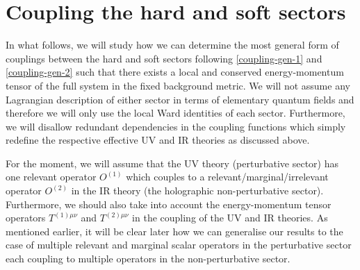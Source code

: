 \documentclass[prd,reprint,a4paper,showpacs,superscriptaddress,11pt,onecolumn,nofootinbib]{revtex4-1}
\renewcommand{\(}{\left(}
\renewcommand{\)}{\right)}
\newcommand{\6}{\partial}
\begin{document}
\section{Coupling the hard and soft sectors}\label{sec:couplingCFTs}
In what follows, we will study how we can determine the most general form of couplings between the hard and soft sectors following \eqref{coupling-gen-1} and \eqref{coupling-gen-2} such that there exists a local and conserved energy-momentum tensor of the full system in the fixed background metric. We will not assume any Lagrangian description of either sector in terms of elementary quantum fields and therefore we will only use the local Ward identities of each sector. Furthermore, we will disallow redundant dependencies in the coupling functions which simply redefine the respective effective UV and IR theories as discussed above.

For the moment, we will assume that the UV theory (perturbative sector) has one relevant operator $O^{(1)}$ which couples to a relevant/marginal/irrelevant operator $O^{(2)}$ in the IR theory (the holographic non-perturbative sector).  Furthermore, we should also take into account the energy-momentum tensor operators $T^{(1)\mu\nu}$ and $T^{(2)\mu\nu}$ in the coupling of the UV and IR theories. As mentioned earlier, it will be clear later how we can generalise our results to the case of multiple relevant and marginal scalar operators in the perturbative sector each coupling to multiple operators in the non-perturbative sector.
\end{document}
